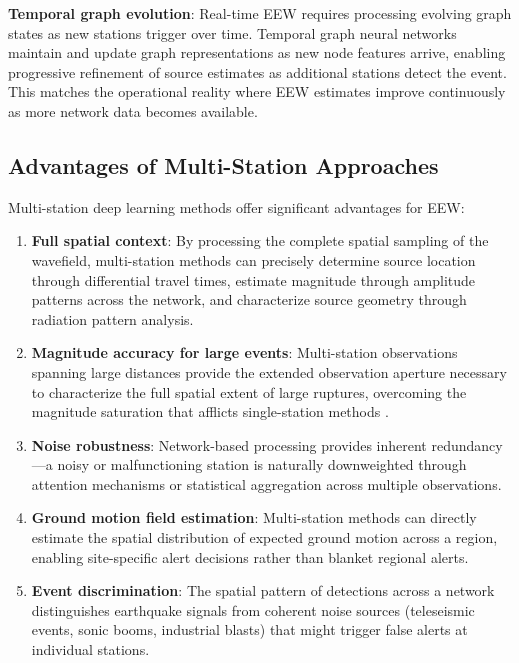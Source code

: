 \documentclass[review,authoryear]{elsarticle}
\begin{document}
\textbf{Temporal graph evolution}: Real-time EEW requires processing evolving graph states as new stations trigger over time. Temporal graph neural networks maintain and update graph representations as new node features arrive, enabling progressive refinement of source estimates as additional stations detect the event. This matches the operational reality where EEW estimates improve continuously as more network data becomes available.

\subsection{Advantages of Multi-Station Approaches}

Multi-station deep learning methods offer significant advantages for EEW:

\begin{enumerate}
\item \textbf{Full spatial context}: By processing the complete spatial sampling of the wavefield, multi-station methods can precisely determine source location through differential travel times, estimate magnitude through amplitude patterns across the network, and characterize source geometry through radiation pattern analysis.

\item \textbf{Magnitude accuracy for large events}: Multi-station observations spanning large distances provide the extended observation aperture necessary to characterize the full spatial extent of large ruptures, overcoming the magnitude saturation that afflicts single-station methods \citep{bose2018finder}.

\item \textbf{Noise robustness}: Network-based processing provides inherent redundancy---a noisy or malfunctioning station is naturally downweighted through attention mechanisms or statistical aggregation across multiple observations.

\item \textbf{Ground motion field estimation}: Multi-station methods can directly estimate the spatial distribution of expected ground motion across a region, enabling site-specific alert decisions rather than blanket regional alerts.

\item \textbf{Event discrimination}: The spatial pattern of detections across a network distinguishes earthquake signals from coherent noise sources (teleseismic events, sonic booms, industrial blasts) that might trigger false alerts at individual stations.
\end{enumerate}
\end{document}

